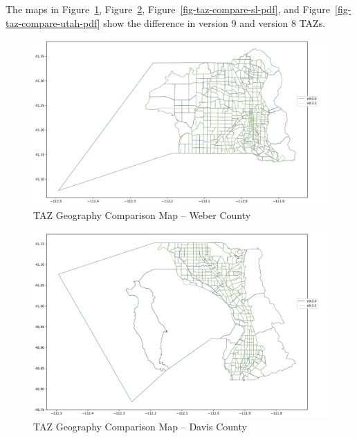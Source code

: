 \documentclass[
  letterpaper,
  DIV=11,
  numbers=noendperiod,
  titlepage=false]{scrreprt}
\begin{document}
The maps in Figure~\ref{fig-taz-compare-weber-pdf},
Figure~\ref{fig-taz-compare-davis-pdf},
Figure~\ref{fig-taz-compare-sl-pdf}, and
Figure~\ref{fig-taz-compare-utah-pdf} show the difference in version 9
and version 8 TAZs.

\begin{figure}[H]

{\centering \includegraphics{v9x/v900/whats-new/2-inputdata_files/figure-pdf/fig-taz-compare-weber-pdf-output-1.pdf}

}

\caption{\label{fig-taz-compare-weber-pdf}TAZ Geography Comparison Map
-- Weber County}

\end{figure}

\begin{figure}[H]

{\centering \includegraphics{v9x/v900/whats-new/2-inputdata_files/figure-pdf/fig-taz-compare-davis-pdf-output-1.pdf}

}

\caption{\label{fig-taz-compare-davis-pdf}TAZ Geography Comparison Map
-- Davis County}

\end{figure}
\end{document}
